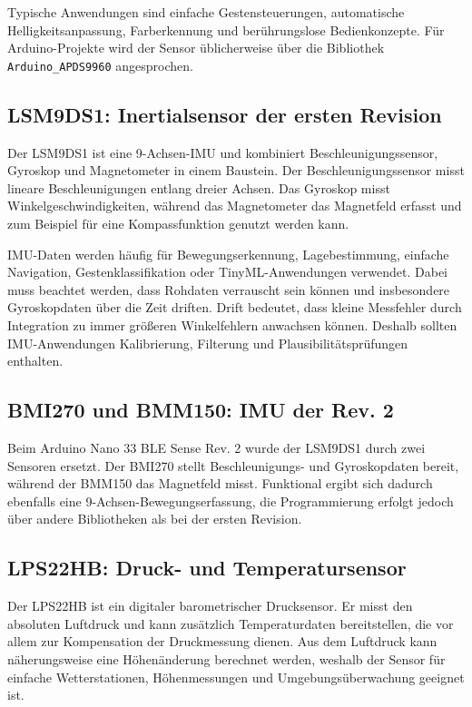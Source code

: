 Typische Anwendungen sind einfache Gestensteuerungen, automatische Helligkeitsanpassung, Farberkennung und berührungslose Bedienkonzepte. Für Arduino-Projekte wird der Sensor üblicherweise über die Bibliothek \texttt{Arduino\_APDS9960} angesprochen.

\subsection{LSM9DS1: Inertialsensor der ersten Revision}

Der LSM9DS1 ist eine 9-Achsen-IMU und kombiniert Beschleunigungssensor, Gyroskop und Magnetometer in einem Baustein. Der Beschleunigungssensor misst lineare Beschleunigungen entlang dreier Achsen. Das Gyroskop misst Winkelgeschwindigkeiten, während das Magnetometer das Magnetfeld erfasst und zum Beispiel für eine Kompassfunktion genutzt werden kann.

IMU-Daten werden häufig für Bewegungserkennung, Lagebestimmung, einfache Navigation, Gestenklassifikation oder TinyML-Anwendungen verwendet. Dabei muss beachtet werden, dass Rohdaten verrauscht sein können und insbesondere Gyroskopdaten über die Zeit driften. Drift bedeutet, dass kleine Messfehler durch Integration zu immer größeren Winkelfehlern anwachsen können. Deshalb sollten IMU-Anwendungen Kalibrierung, Filterung und Plausibilitätsprüfungen enthalten.

\subsection{BMI270 und BMM150: IMU der Rev. 2}

Beim Arduino Nano 33 BLE Sense Rev. 2 wurde der LSM9DS1 durch zwei Sensoren ersetzt. Der BMI270 stellt Beschleunigungs- und Gyroskopdaten bereit, während der BMM150 das Magnetfeld misst. Funktional ergibt sich dadurch ebenfalls eine 9-Achsen-Bewegungserfassung, die Programmierung erfolgt jedoch über andere Bibliotheken als bei der ersten Revision.

\subsection{LPS22HB: Druck- und Temperatursensor}

Der LPS22HB ist ein digitaler barometrischer Drucksensor. Er misst den absoluten Luftdruck und kann zusätzlich Temperaturdaten bereitstellen, die vor allem zur Kompensation der Druckmessung dienen. Aus dem Luftdruck kann näherungsweise eine Höhenänderung berechnet werden, weshalb der Sensor für einfache Wetterstationen, Höhenmessungen und Umgebungsüberwachung geeignet ist.

